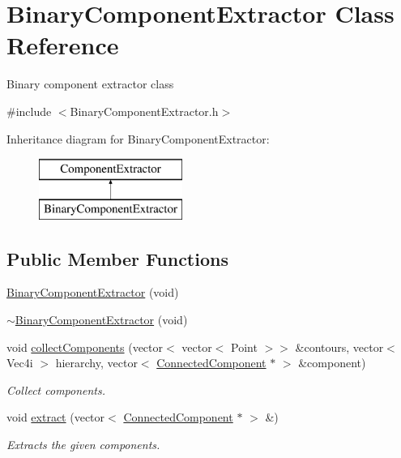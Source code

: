 \hypertarget{class_binary_component_extractor}{\section{Binary\+Component\+Extractor Class Reference}
\label{class_binary_component_extractor}
}


Binary component extractor class  




{\ttfamily \#include $<$Binary\+Component\+Extractor.\+h$>$}

Inheritance diagram for Binary\+Component\+Extractor\+:\begin{figure}[H]
\begin{center}
\leavevmode
\includegraphics[height=2.000000cm]{class_binary_component_extractor}
\end{center}
\end{figure}
\subsection*{Public Member Functions}
\begin{DoxyCompactItemize}
\item 
\hyperlink{class_binary_component_extractor_ab350a4d29003655c652d7e7943e7854e}{Binary\+Component\+Extractor} (void)
\item 
\hyperlink{class_binary_component_extractor_aa1be60410fd2e11b1bedfeac3bb44519}{$\sim$\+Binary\+Component\+Extractor} (void)
\item 
void \hyperlink{class_binary_component_extractor_a675e103667b7eeb343765c0daa5686a5}{collect\+Components} (vector$<$ vector$<$ Point $>$$>$ \&contours, vector$<$ Vec4i $>$ hierarchy, vector$<$ \hyperlink{class_connected_component}{Connected\+Component} $\ast$ $>$ \&component)
\begin{DoxyCompactList}\small\item\em Collect components. \end{DoxyCompactList}\item 
void \hyperlink{class_binary_component_extractor_a16232815f3a3e8e28fd80a733ff71383}{extract} (vector$<$ \hyperlink{class_connected_component}{Connected\+Component} $\ast$ $>$ \&)
\begin{DoxyCompactList}\small\item\em Extracts the given components. \end{DoxyCompactList}\end{DoxyCompactItemize}
